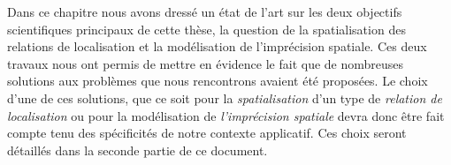 Dans ce chapitre nous avons dressé un état de l'art sur les deux
objectifs scientifiques principaux de cette thèse, la question de la
spatialisation des relations de localisation et la modélisation de
l'imprécision spatiale. Ces deux travaux nous ont permis de mettre en
évidence le fait que de nombreuses solutions aux problèmes que nous
rencontrons avaient été proposées. Le choix d'une de ces solutions,
que ce soit pour la \emph{spatialisation} d'un type de \emph{relation
  de localisation} ou pour la modélisation de \emph{l'imprécision
  spatiale} devra donc être fait compte tenu des spécificités de notre
contexte applicatif. Ces choix seront détaillés dans la seconde partie
de ce document.


